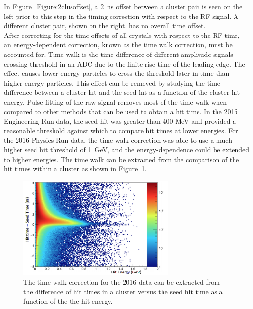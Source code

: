 In Figure~\ref{Figure:2clusoffset}, a 2~ns offset between a cluster pair is seen on the left prior to this step in the timing correction with respect to the RF signal. A different cluster pair, shown on the right, has no overall time offset. \\
\indent After correcting for the time offsets of all crystals with respect to the RF time, an energy-dependent correction, known as the time walk correction, must be accounted for. Time walk is the time difference of different amplitude signals crossing threshold in an ADC due to the finite rise time of the leading edge. The effect causes lower energy particles to cross the threshold later in time than higher energy particles. This effect can be removed by studying the time difference between a cluster hit and the seed hit as a function of the cluster hit energy. Pulse fitting of the raw signal removes most of the time walk when compared to other methods that can be used to obtain a hit time. In the 2015 Engineering Run data, the seed hit was greater than 400 MeV and provided a reasonable threshold against which to compare hit times at lower energies. For the 2016 Physics Run data, the time walk correction was able to use a much higher seed hit threshold of 1~GeV, and the energy-dependence could be extended to higher energies. The time walk can be extracted from the comparison of the hit times within a cluster as shown in Figure~\ref{Figure:hittimeincluster}.

\begin{figure}[htb]
  \centering
      \includegraphics[width=0.7\textwidth]{pics/performance/hittimeincluster.png}
  \caption[Hit times in a cluster versus the hit energy]{The time walk correction for the 2016 data can be extracted from the difference of hit times in a cluster versus the seed hit time as a function of the the hit energy.}
  \label{Figure:hittimeincluster}
\end{figure}

